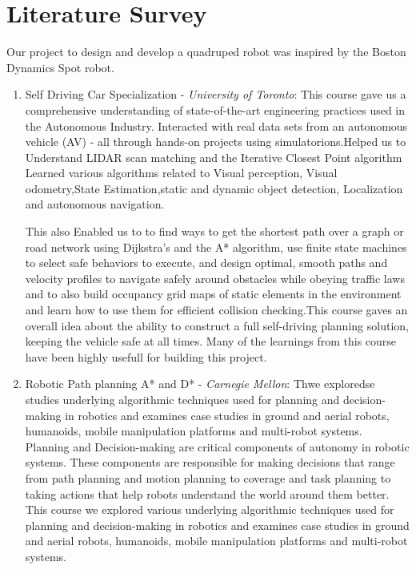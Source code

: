 \chapter{Literature Survey}

Our project to design and develop a quadruped robot was inspired by the Boston Dynamics Spot\textsuperscript{\textregistered} robot.

\begin{enumerate}
    \item Self Driving Car Specialization - \emph{University of Toronto}: This course gave us a comprehensive understanding of state-of-the-art engineering practices used in the Autonomous Industry. Interacted with real data sets from an autonomous vehicle (AV) - all through hands-on projects using simulatorions.Helped us to Understand LIDAR scan matching and the Iterative Closest Point algorithm  Learned various algorithms related to Visual perception, Visual odometry,State Estimation,static and dynamic object detection, Localization and autonomous navigation.
    
     This also Enabled us to to find ways to get the shortest path over a graph or road network using Dijkstra's and the A* algorithm, use finite state machines to select safe behaviors to execute, and design optimal, smooth paths and velocity profiles to navigate safely around obstacles while obeying traffic laws and to also build occupancy grid maps of static elements in the environment and learn how to use them for efficient collision checking.This course gaves an overall idea about the ability to construct a full self-driving planning solution, keeping the vehicle safe at all times. Many of the learnings from this course have been highly usefull for building this project.
 
    \item Robotic Path planning A* and D* - \emph{Carnegie Mellon}: Thwe exploredse studies underlying algorithmic techniques used for planning and decision-making in robotics and examines case studies in ground and aerial robots, humanoids, mobile manipulation platforms and multi-robot systems. Planning and Decision-making are critical components of autonomy in robotic systems. These components are responsible for making decisions that range from path planning and motion planning to coverage and task planning to taking actions that help robots understand the world around them better. This course we explored various underlying algorithmic techniques used for planning and decision-making in robotics and examines case studies in ground and aerial robots, humanoids, mobile manipulation platforms and multi-robot systems.


\end{enumerate}
